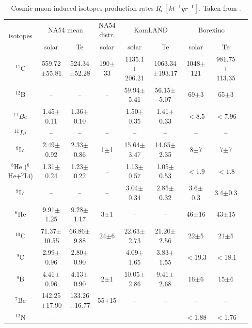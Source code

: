 \begin{table}[ht]
	\caption{Cosmic muon induced isotopes production rates $R_i~[kt^{-1}yr^{−1}]$. Taken from \cite{nndc}.}\label{estimateRates}
	\centering
	\scriptsize
	\begin{tabular*}{170mm}{c@{\extracolsep{\fill}}cccccccc}
		\toprule 
		\multirow{2}{*}{isotopes} &\multicolumn{2}{c}{NA54 mean}& NA54 distr.& \multicolumn{2}{c}{KamLAND}& \multicolumn{2}{c}{Borexino}\\
		\cline{2-3}   \cline{5-6} \cline{7-8}
		& solar & Te & solar  & solar & Te & solar & Te\\
		\midrule
		$^{11}$C &559.72$\pm$55.81 &524.34$\pm$52.28 &190$\pm$33 &1135.1$\pm$206.21 &1063.34$\pm$193.17& 1048$\pm$121 &981.75$\pm$113.35\\
		$^{12}$B & -- & -- & -- & 59.94$\pm$5.41& 56.15$\pm$5.07 &69$\pm$3 &65$\pm$3\\
		$^{11}Be$&  1.45$\pm$0.11& 1.36$\pm$0.10& -- &1.50$\pm$0.35 &1.41$\pm$0.33& $<8.5$ & $<7.96$ \\
                $^{11}Li$ & -- & -- & -- & -- & -- & -- & --\\
		$^8$Li & 2.49$\pm$0.92 & 2.33$\pm$0.86 & 1$\pm$1 & 15.64$\pm$3.47 & 14.65$\pm$2.35 & 8$\pm$7 & 7$\pm$7\\
		$^8$He ($^8$He+$^9$Li) & 1.31$\pm$0.24 & 1.23$\pm$0.22 & -- & 1.13$\pm$0.57 & 1.05$\pm$0.53 & $<1.9$ & $<1.8$\\
		$^9$Li & --&  --&  --&  3.04$\pm$0.34 & 2.85$\pm$0.32 & 3.6$\pm$0.3 & 3.4$\pm$0.3\\
        $^6$He & 9.91$\pm$1.25 & 9.28$\pm$1.17 & 3$\pm$1 &-- &-- &46$\pm$16 & 43$\pm$15\\
		$^{10}$C & 71.37$\pm$10.55 & 66.86$\pm$9.88 & 24$\pm$6 & 22.63$\pm$2.73 & 21.20$\pm$2.56 & 22$\pm$5 & 21$\pm$5\\
        $^9$C & 2.99$\pm$0.96 & 2.80$\pm$0.90 & -- & 4.09$\pm$1.65 & 3.83$\pm$1.55 & $<19.3$ & $<18.1$\\
        $^8$B & 4.41$\pm$0.96 & 4.13$\pm$0.90 & 2$\pm$1 & 10.05$\pm$2.86 & 9.41$\pm$2.68 & 16$\pm$6 & 15$\pm$6\\
		$^7$Be &142.25$\pm$17.90 & 133.26$\pm$16.77 & 55$\pm$15 & -- & -- & -- & --\\
		$^{12}$N & -- &--& --& --& --& $<1.88$ & $<1.76$\\
		\bottomrule
	\end{tabular*}
\end{table}


